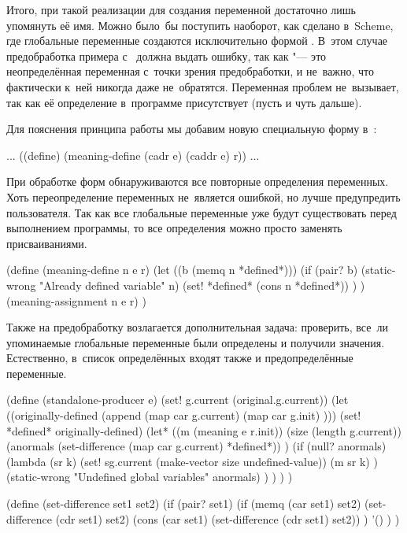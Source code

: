 Итого, при такой реализации для создания переменной достаточно лишь упомянуть
её имя. Можно было~бы поступить наоборот, как сделано в~Scheme, где глобальные
переменные создаются исключительно формой . В~этом случае
предобработка примера с~ должна выдать ошибку, так как  "---
это неопределённая переменная с~точки зрения предобработки, и не~важно, что
фактически к~ней никогда даже не~обратятся. Переменная  проблем
не~вызывает, так как её определение в~программе присутствует (пусть и чуть
дальше).


Для пояснения принципа работы  мы добавим новую специальную форму
в~:

\begin{code:lisp}
... ((define) (meaning-define (cadr e) (caddr e) r)) ...
\end{code:lisp}

При обработке форм  обнаруживаются все повторные определения
переменных. Хоть переопределение переменных не~является ошибкой, но лучше
предупредить пользователя. Так как все глобальные переменные уже будут
существовать перед выполнением программы, то все определения можно просто
заменять присваиваниями.

\begin{code:lisp}
(define (meaning-define n e r)
  (let ((b (memq n *defined*)))
    (if (pair? b)
        (static-wrong "Already defined variable" n)
        (set! *defined* (cons n *defined*)) ) )
  (meaning-assignment n e r) )
\end{code:lisp}

Также на предобработку возлагается дополнительная задача: проверить, все~ли
упоминаемые глобальные переменные были определены и получили значения.
Естественно, в~список определённых входят также и предопределённые переменные.

\begin{code:lisp}
(define (standalone-producer e)
  (set! g.current (original.g.current))
  (let ((originally-defined (append (map car g.current)
                                    (map car g.init) )))
    (set! *defined* originally-defined)
    (let* ((m (meaning e r.init))
           (size (length g.current))
           (anormals (set-difference (map car g.current) *defined*)) )
      (if (null? anormals)
          (lambda (sr k)
            (set! sg.current (make-vector size undefined-value))
            (m sr k) )
          (static-wrong "Undefined global variables" anormals) ) ) ) )

(define (set-difference set1 set2)
  (if (pair? set1)
      (if (memq (car set1) set2)
          (set-difference (cdr set1) set2)
          (cons (car set1) (set-difference (cdr set1) set2)) )
      '() ) )
\end{code:lisp}

